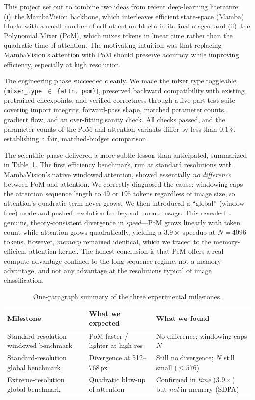 \documentclass[11pt,a4paper]{article}
\begin{document}
This project set out to combine two ideas from recent deep-learning literature: (i)~the MambaVision backbone, which interleaves efficient state-space (Mamba) blocks with a small number of self-attention blocks in its final stages; and (ii)~the Polynomial Mixer (PoM), which mixes tokens in linear time rather than the quadratic time of attention. The motivating intuition was that replacing MambaVision's attention with PoM should preserve accuracy while improving efficiency, especially at high resolution.

The engineering phase succeeded cleanly. We made the mixer type toggleable (\texttt{mixer\_type \(\in\) \{attn, pom\}}), preserved backward compatibility with existing pretrained checkpoints, and verified correctness through a five-part test suite covering import integrity, forward-pass shape, matched parameter counts, gradient flow, and an over-fitting sanity check. All checks passed, and the parameter counts of the PoM and attention variants differ by less than $0.1\%$, establishing a fair, matched-budget comparison.

The scientific phase delivered a more subtle lesson than anticipated, summarized in Table~\ref{tab:summary}. The first efficiency benchmark, run at standard resolutions with MambaVision's native windowed attention, showed essentially \emph{no difference} between PoM and attention. We correctly diagnosed the cause: windowing caps the attention sequence length to $49$ or $196$ tokens regardless of image size, so attention's quadratic term never grows. We then introduced a ``global'' (window-free) mode and pushed resolution far beyond normal usage. This revealed a genuine, theory-consistent divergence in \emph{speed}---PoM grows linearly with token count while attention grows quadratically, yielding a $3.9\times$ speedup at $N=4096$ tokens. However, \emph{memory} remained identical, which we traced to the memory-efficient attention kernel. The honest conclusion is that PoM offers a real compute advantage confined to the long-sequence regime, not a memory advantage, and not any advantage at the resolutions typical of image classification.

\begin{table}[H]
\centering
\caption{One-paragraph summary of the three experimental milestones.}
\label{tab:summary}
\small
\begin{tabular}{p{3.2cm} p{5.0cm} p{5.5cm}}
\toprule
\textbf{Milestone} & \textbf{What we expected} & \textbf{What we found} \\
\midrule
Standard-resolution windowed benchmark & PoM faster / lighter at high res & No difference; windowing caps $N$ \\
Standard-resolution global benchmark & Divergence at 512--768\,px & Still no divergence; $N$ still small ($\le 576$) \\
Extreme-resolution global benchmark & Quadratic blow-up of attention & Confirmed in \emph{time} ($3.9\times$) but \emph{not} in memory (SDPA) \\
\bottomrule
\end{tabular}
\end{table}
\end{document}
